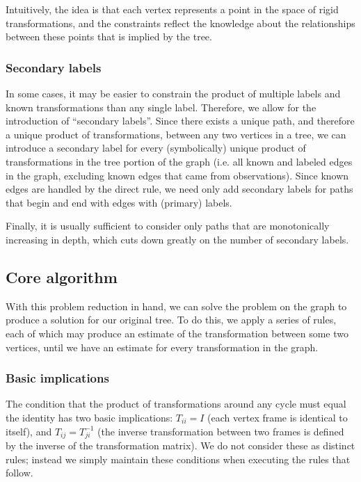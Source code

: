 Intuitively, the idea is that each vertex represents a point in the space of rigid transformations,
and the constraints reflect the knowledge about the relationships between these points that 
is implied by the tree. 

\subsubsection{Secondary labels}
In some cases, it may be easier to constrain the product of multiple labels and known transformations
than any single label. Therefore, we allow for the introduction of ``secondary labels''. 
Since there exists a unique path, and therefore a unique product of transformations, between any
two vertices in a tree, we can introduce a secondary label for every (symbolically) unique product
of transformations in the tree portion of the graph (i.e. all known and labeled edges in the graph,
excluding known edges that came from observations). Since known edges are handled by the direct rule,
we need only add secondary labels for paths that begin and end with edges with (primary) labels.

Finally, it is usually sufficient to consider only 
paths that are monotonically increasing in depth, which cuts down greatly on the number of secondary labels.

\subsection{Core algorithm}

With this problem reduction in hand, we can solve the problem on the graph to produce a solution 
for our original tree. To do this, we apply a series of rules, each of which may produce an estimate
of the transformation between some two vertices, until we have an estimate for every transformation
in the graph.

\subsubsection{Basic implications}

The condition that the product of transformations around any cycle must equal the identity has two
basic implications: $T_{ii} = I$ (each vertex frame is identical to itself), and $T_{ij} = T_{ji}^{-1}$
(the inverse transformation between two frames is defined by the inverse of the transformation matrix).
We do not consider these as distinct rules; instead we simply maintain these conditions when executing the
rules that follow.

